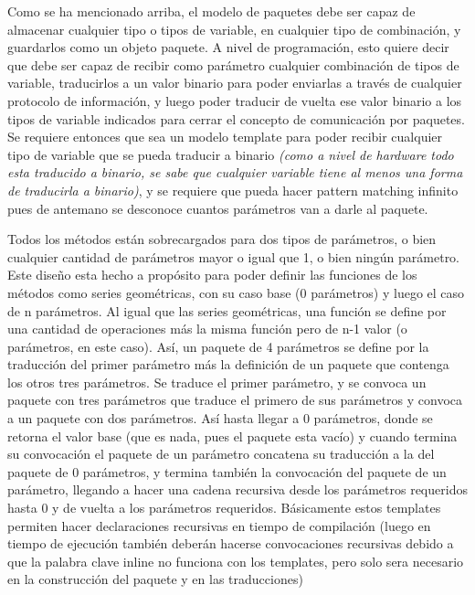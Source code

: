 \documentclass{report}
\begin{document}
Como se ha mencionado arriba, el modelo de paquetes debe ser capaz de almacenar cualquier tipo o tipos de variable, en cualquier tipo de combinación, y guardarlos como un objeto paquete. A nivel de programación, esto quiere decir que debe ser capaz de recibir como parámetro cualquier combinación de tipos de variable, traducirlos a un valor binario para poder enviarlas a través de cualquier protocolo de información, y luego poder traducir de vuelta ese valor binario a los tipos de variable indicados para cerrar el concepto de comunicación por paquetes. Se requiere entonces que sea un modelo template para poder recibir cualquier tipo de variable que se pueda traducir a binario \textit{(como a nivel de hardware todo esta traducido a binario, se sabe que cualquier variable tiene al menos una forma de traducirla a binario)}, y se requiere que pueda hacer pattern matching infinito pues de antemano se desconoce cuantos parámetros van a darle al paquete. \par \vspace{0.3 cm}
Todos los métodos están sobrecargados para dos tipos de parámetros, o bien cualquier cantidad de parámetros mayor o igual que 1, o bien ningún parámetro. Este diseño esta hecho a propósito para poder definir las funciones de los métodos como series geométricas, con su caso base (0 parámetros) y luego el caso de n parámetros. Al igual que las series geométricas, una función se define por una cantidad de operaciones más la misma función pero de n-1 valor (o parámetros, en este caso). Así, un paquete de 4 parámetros se define por la traducción del primer parámetro más la definición de un paquete que contenga los otros tres parámetros. Se traduce el primer parámetro, y se convoca un paquete con tres parámetros que traduce el primero de sus parámetros y convoca a un paquete con dos parámetros. Así hasta llegar a 0 parámetros, donde se retorna el valor base (que es nada, pues el paquete esta vacío) y cuando termina su convocación el paquete de un parámetro concatena su traducción a la del paquete de 0 parámetros, y termina también la convocación del paquete de un parámetro, llegando a hacer una cadena recursiva desde los parámetros requeridos hasta 0 y de vuelta a los parámetros requeridos. Básicamente estos templates permiten hacer declaraciones recursivas en tiempo de compilación (luego en tiempo de ejecución también deberán hacerse convocaciones recursivas debido a que la palabra clave inline no funciona con los templates, pero solo sera necesario en la construcción del paquete y en las traducciones)
\par \vspace{0.3 cm}
\end{document}
